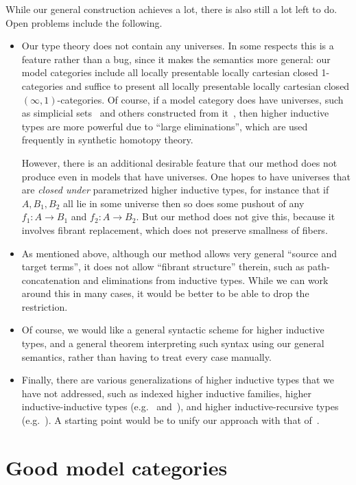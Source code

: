 \documentclass[referee]{psp}
\begin{document}
While our general construction achieves a lot, there is also still a lot left to do.
Open problems include the following.
\begin{itemize}
\item Our type theory does not contain any universes.
  In some respects this is a feature rather than a bug, since it makes the semantics more general: our model categories include all locally presentable locally cartesian closed 1-categories and suffice to present all locally presentable locally cartesian closed $(\infty,1)$-categories.
  Of course, if a model category does have universes, such as simplicial sets~\cite{klv:ssetmodel} and others constructed from it~\cite{shulman:invdia,shulman:elreedy,cisinski:elegant,shulman:eiuniv}, then higher inductive types are more powerful due to ``large eliminations'', which are used frequently in synthetic homotopy theory.

  However, there is an additional desirable feature that our method does not produce even in models that have universes.
  One hopes to have universes that are \emph{closed under} parametrized higher inductive types, for instance that if $A,B_1,B_2$ all lie in some universe then so does some pushout of any $f_1:A\to B_1$ and $f_2:A\to B_2$.
  But our method does not give this, because it involves fibrant replacement, which does not preserve smallness of fibers.
\item As mentioned above, although our method allows very general ``source and target terms'', it does not allow ``fibrant structure'' therein, such as path-concatenation and eliminations from inductive types.
  While we can work around this in many cases, it would be better to be able to drop the restriction.
\item Of course, we would like a general syntactic scheme for higher inductive types, and a general theorem interpreting such syntax using our general semantics, rather than having to treat every case manually.
\item Finally, there are various generalizations of higher inductive types that we have not addressed, such as indexed higher inductive families, higher inductive-inductive types (e.g.~\cite[Chapter 11]{hottbook} and~\cite{ak:tt-qit}), and higher inductive-recursive types (e.g.~\cite{shulman:hiru-tdd}).
  A starting point would be to unify our approach with that of~\cite{acdf:qiits}.
\end{itemize}


\section{Good model categories}
\label{sec:model-categ-type}
\end{document}
